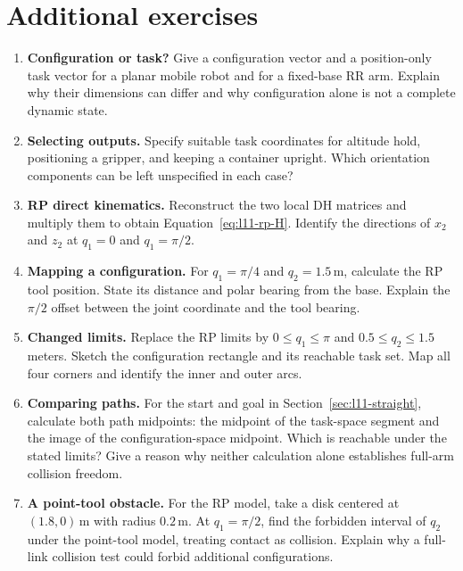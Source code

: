 \section{Additional exercises}
\begin{enumerate}
\item \textbf{Configuration or task?} Give a configuration vector and
a position-only task vector for a planar mobile robot and for a fixed-base
RR arm. Explain why their dimensions can differ and why configuration
alone is not a complete dynamic state.

\item \textbf{Selecting outputs.} Specify suitable task coordinates for
altitude hold, positioning a gripper, and keeping a container upright.
Which orientation components can be left unspecified in each case?

\item \textbf{RP direct kinematics.} Reconstruct the two local DH matrices
and multiply them to obtain Equation~\eqref{eq:l11-rp-H}. Identify the
directions of $x_2$ and $z_2$ at $q_1=0$ and $q_1=\pi/2$.

\item \textbf{Mapping a configuration.} For $q_1=\pi/4$ and
$q_2=1.5\,\mathrm m$, calculate the RP tool position. State its distance
and polar bearing from the base. Explain the $\pi/2$ offset between the
joint coordinate and the tool bearing.

\item \textbf{Changed limits.} Replace the RP limits by
$0\le q_1\le\pi$ and $0.5\le q_2\le1.5$ meters. Sketch the configuration
rectangle and its reachable task set. Map all four corners and identify
the inner and outer arcs.

\item \textbf{Comparing paths.} For the start and goal in
Section~\ref{sec:l11-straight}, calculate both path midpoints: the midpoint
of the task-space segment and the image of the configuration-space
midpoint. Which is reachable under the stated limits? Give a reason why
neither calculation alone establishes full-arm collision freedom.

\item \textbf{A point-tool obstacle.} For the RP model, take a disk
centered at $(1.8,0)\,\mathrm m$ with radius $0.2\,\mathrm m$. At
$q_1=\pi/2$, find the forbidden interval of $q_2$ under the point-tool
model, treating contact as collision. Explain why a full-link collision
test could forbid additional configurations.
\end{enumerate}
